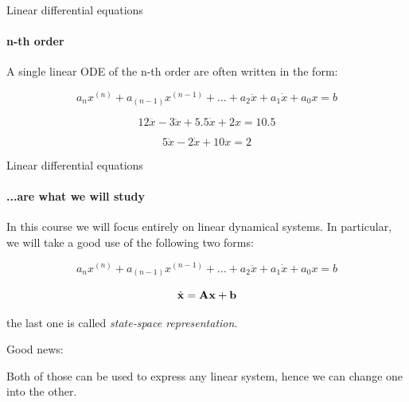 \documentclass{beamer}
\begin{document}
\begin{frame}{Linear differential equations}
\framesubtitle{n-th order}
\begin{flushleft}

A single linear ODE of the n-th order are often written in the form:

\begin{equation}
    a_n x^{(n)} + a_{(n-1)} x^{(n-1)} + 
    ... +
    a_2 \ddot{x} + a_1 \dot{x} + 
    a_0 x = b
\end{equation}

\begin{example}
\begin{equation}
12 \dddot{x} -
    3 \ddot{x} + 5.5 \dot{x} + 
    2 x = 10.5
\end{equation}
\end{example}

\begin{example}
\begin{equation}
    5 \ddot{x} - 2 \dot{x} + 
    10 x = 2
\end{equation}
\end{example}

\end{flushleft}
\end{frame}


\begin{frame}{Linear differential equations}
\framesubtitle{...are what we will study}
\begin{flushleft}

In this course we will focus entirely on linear dynamical systems. In particular, we will take a good use of the following two forms:

\begin{equation}
    a_n x^{(n)} + a_{(n-1)} x^{(n-1)} + 
    ... +
    a_2 \ddot{x} + a_1 \dot{x} + 
    a_0 x = b
\end{equation}

\begin{equation}
    \dot{\mathbf{x}} = \mathbf{A} \mathbf{x} + \mathbf{b}
\end{equation}

the last one is called \emph{state-space representation}.

\begin{exampleblock}{Good news:}

\hfill \break
Both of those can be used to express any linear system, hence we can change one into the other.
\newline

\end{exampleblock}

\end{flushleft}
\end{frame}
\end{document}
